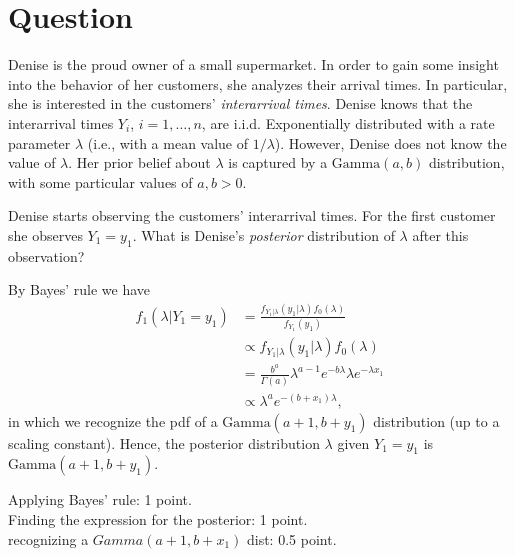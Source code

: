 \section{Question}

Denise is the proud owner of a small supermarket. In order to gain some insight into the behavior of her customers, she analyzes their arrival times. In particular, she is interested in the customers' \textit{interarrival times}. Denise knows that the interarrival times $Y_i$, $i=1,\ldots,n$, are i.i.d. Exponentially distributed with a rate parameter $\lambda$ (i.e., with a mean value of $1/\lambda$). However, Denise does not know the value of $\lambda$. Her prior belief about $\lambda$ is captured by a $\text{Gamma}(a,b)$ distribution, with some particular values of $a,b > 0$.

\begin{exercise}[2.5]
Denise starts observing the customers' interarrival times. For the first customer she observes $Y_1 = y_1$. What is Denise's \textit{posterior} distribution of $\lambda$ after this observation?
\begin{solution}
By Bayes' rule we have
\begin{align}
    f_1(\lambda|Y_1 = y_1) &= \frac{f_{Y_1|\lambda}(y_1|\lambda) f_0(\lambda)}{f_{Y_1}(y_1)} \\
    &\propto f_{Y_1|\lambda}(y_1|\lambda) f_0(\lambda) \\
    &= \frac{b^a}{\Gamma(a)}\lambda^{a-1} e^{-b\lambda} \lambda e^{-\lambda x_1} \\
    &\propto \lambda^{a} e^{-(b + x_1)\lambda},
\end{align}
in which we recognize the pdf of a $\text{Gamma}(a+1,b+y_1)$ distribution (up to a scaling constant). Hence, the posterior distribution $\lambda$ given $Y_1 = y_1$ is $\text{Gamma}(a+1,b+y_1)$.

Applying Bayes' rule: 1 point.\\
Finding the expression for the posterior: 1 point.\\
recognizing a $Gamma(a+1,b+x_1)$ dist: 0.5 point.
\end{solution}
\end{exercise}



